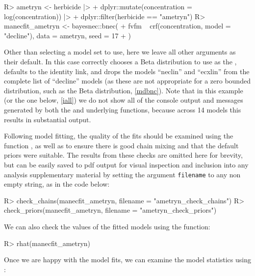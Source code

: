 \documentclass[
  shortnames]{jss}
\begin{document}
\begin{CodeChunk}
\begin{CodeInput}
R> ametryn <- herbicide |>
+   dplyr::mutate(concentration = log(concentration)) |> 
+   dplyr::filter(herbicide == "ametryn")
R> manecfit_ametryn <- bayesnec::bnec(
+   fvfm ~ crf(concentration, model = "decline"), data = ametryn, seed = 17
+ )
\end{CodeInput}
\end{CodeChunk}

Other than selecting a model set to use, here we leave all other  arguments as their default. In this case  correctly chooses a Beta distribution to use as the , defaults to the identity link, and drops the models ``neclin'' and ``ecxlin'' from the complete list of ``decline'' models (as these are not appropriate for a zero bounded distribution, such as the Beta distribution, \ref{mdbnc}). Note that in this example (or the one below, \ref{iall}) we do not show all of the console output and messages generated by both the  and underlying  functions, because across 14 models this results in substantial output.

Following model fitting, the quality of the fits should be examined using the function , as well as  to ensure there is good chain mixing and that the default priors were suitable. The results from these checks are omitted here for brevity, but can be easily saved to pdf output for visual inspection and inclusion into any analysis supplementary material by setting the argument \texttt{filename} to any non empty string, as in the code below:

\begin{CodeChunk}
\begin{CodeInput}
R> check_chains(manecfit_ametryn, filename = "ametryn_check_chains")
R> check_priors(manecfit_ametryn, filename = "ametryn_check_priors")
\end{CodeInput}
\end{CodeChunk}

We can also check the  values of the fitted models using the  function:

\begin{CodeChunk}
\begin{CodeInput}
R> rhat(manecfit_ametryn)
\end{CodeInput}
\end{CodeChunk}

Once we are happy with the model fits, we can examine the model statistics using :
\end{document}
